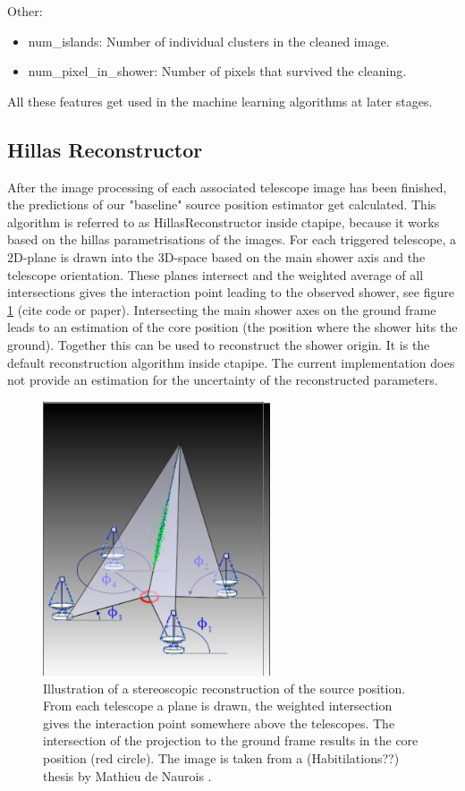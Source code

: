Other:
\begin{itemize}
    \item{num_islands: Number of individual clusters in the cleaned image.}
    \item{num_pixel_in_shower: Number of pixels that survived the cleaning.}
\end{itemize}

All these features get used in the machine learning algorithms at later stages.

\subsection{Hillas Reconstructor}  %
After the image processing of each associated telescope image has been finished,
the predictions of our "baseline" source position estimator get calculated.
This algorithm is referred to as HillasReconstructor inside ctapipe, because 
it works based on the hillas parametrisations of the images.
For each triggered telescope, a 2D-plane is drawn into the 3D-space based on the main shower 
axis and the telescope orientation. These planes intersect and 
the weighted average of all intersections gives the 
interaction point leading to the observed shower,
see figure \ref{fig:hillas_reconstructor} (cite code or paper).
Intersecting the main shower axes on the ground frame leads to 
an estimation of the core position (the position where the 
shower hits the ground).
Together this can be used to reconstruct the shower origin.
It is the default reconstruction algorithm inside ctapipe.
The current implementation does not provide an 
estimation for the uncertainty of the reconstructed parameters.

\begin{figure}
	\centering
	\includegraphics[width=0.6\textwidth]{images/hillas_reco.png}
	\caption{Illustration of a stereoscopic reconstruction of the source position.
    From each telescope a plane is drawn, the weighted intersection gives the interaction 
    point somewhere above the telescopes. The intersection of the projection to 
    the ground frame results in the core position (red circle). 
    The image is taken from a (Habitilations??) thesis by 
    Mathieu de Naurois \cite{hillas_reco}.}
	\label{fig:hillas_reconstructor}
\end{figure}

